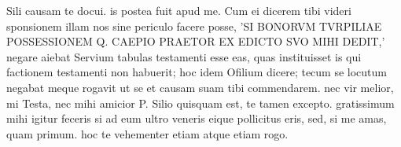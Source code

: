 


 Sili causam te docui. is postea fuit apud me. Cum ei dicerem tibi videri sponsionem illam nos sine periculo facere posse, 'SI BONORVM TVRPILIAE POSSESSIONEM Q. CAEPIO PRAETOR EX EDICTO SVO MIHI DEDIT,' negare aiebat Servium tabulas testamenti esse eas, quas instituisset is qui factionem testamenti non habuerit; hoc idem Ofilium dicere; tecum se locutum negabat meque rogavit ut se et causam suam tibi commendarem. nec vir melior, mi Testa, nec mihi amicior P. Silio quisquam est, te tamen excepto. gratissimum mihi igitur feceris si ad eum ultro veneris eique pollicitus eris, sed, si me amas, quam primum. hoc te vehementer etiam atque etiam rogo.
